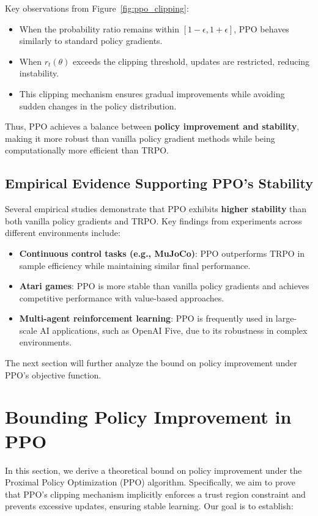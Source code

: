 \documentclass[12pt]{extreport} %
\begin{document}
Key observations from Figure~\ref{fig:ppo_clipping}:
\begin{itemize}
    \item When the probability ratio remains within $[1 - \epsilon, 1 + \epsilon]$, PPO behaves similarly to standard policy gradients.
    \item When $r_t(\theta)$ exceeds the clipping threshold, updates are restricted, reducing instability.
    \item This clipping mechanism ensures gradual improvements while avoiding sudden changes in the policy distribution.
\end{itemize}

Thus, PPO achieves a balance between \textbf{policy improvement and stability}, making it more robust than vanilla policy gradient methods while being computationally more efficient than TRPO.

\subsection{Empirical Evidence Supporting PPO's Stability}

Several empirical studies demonstrate that PPO exhibits \textbf{higher stability} than both vanilla policy gradients and TRPO. Key findings from experiments across different environments include:

\begin{itemize}
    \item \textbf{Continuous control tasks (e.g., MuJoCo)}: PPO outperforms TRPO in sample efficiency while maintaining similar final performance.
    \item \textbf{Atari games}: PPO is more stable than vanilla policy gradients and achieves competitive performance with value-based approaches.
    \item \textbf{Multi-agent reinforcement learning}: PPO is frequently used in large-scale AI applications, such as OpenAI Five, due to its robustness in complex environments.
\end{itemize}


The next section will further analyze the bound on policy improvement under PPO's objective function.


\section{Bounding Policy Improvement in PPO}

In this section, we derive a theoretical bound on policy improvement under the Proximal Policy Optimization (PPO) algorithm. Specifically, we aim to prove that PPO's clipping mechanism implicitly enforces a trust region constraint and prevents excessive updates, ensuring stable learning. Our goal is to establish:
\end{document}
